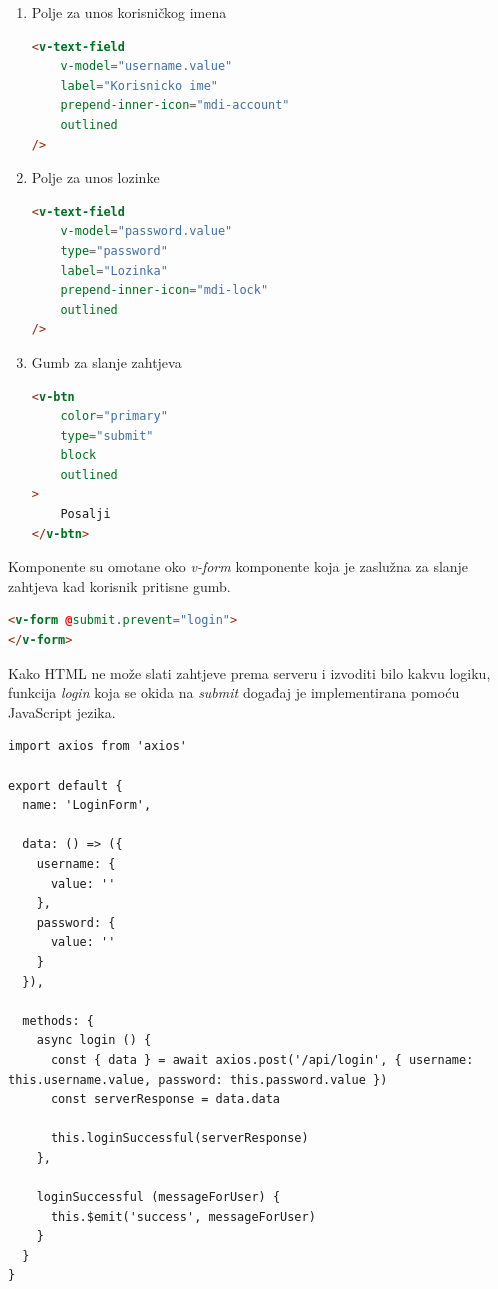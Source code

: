 \begin{enumerate}
    \item Polje za unos korisničkog imena
        \begin{lstlisting}[language=HTML]
<v-text-field
    v-model="username.value"
    label="Korisnicko ime"
    prepend-inner-icon="mdi-account"
    outlined
/>
        \end{lstlisting}
    \item Polje za unos lozinke
        \begin{lstlisting}[language=HTML]
<v-text-field
    v-model="password.value"
    type="password"
    label="Lozinka"
    prepend-inner-icon="mdi-lock"
    outlined
/>
        \end{lstlisting}
    \item Gumb za slanje zahtjeva
        \begin{lstlisting}[language=HTML]
<v-btn
    color="primary"
    type="submit"
    block
    outlined
>
    Posalji
</v-btn>
        \end{lstlisting}
\end{enumerate}

Komponente su omotane oko \textit{v-form} komponente koja je zaslužna za slanje zahtjeva kad korisnik pritisne gumb.

\begin{lstlisting}[language=HTML]
<v-form @submit.prevent="login">
</v-form>
\end{lstlisting}

Kako HTML ne može slati zahtjeve prema serveru i izvoditi bilo kakvu logiku, funkcija \textit{login} koja se okida na
\textit{submit} događaj je implementirana pomoću JavaScript jezika.

\begin{lstlisting}
import axios from 'axios'

export default {
  name: 'LoginForm',

  data: () => ({
    username: {
      value: ''
    },
    password: {
      value: ''
    }
  }),

  methods: {
    async login () {
      const { data } = await axios.post('/api/login', { username: this.username.value, password: this.password.value })
      const serverResponse = data.data

      this.loginSuccessful(serverResponse)
    },

    loginSuccessful (messageForUser) {
      this.$emit('success', messageForUser)
    }
  }
}
\end{lstlisting}

